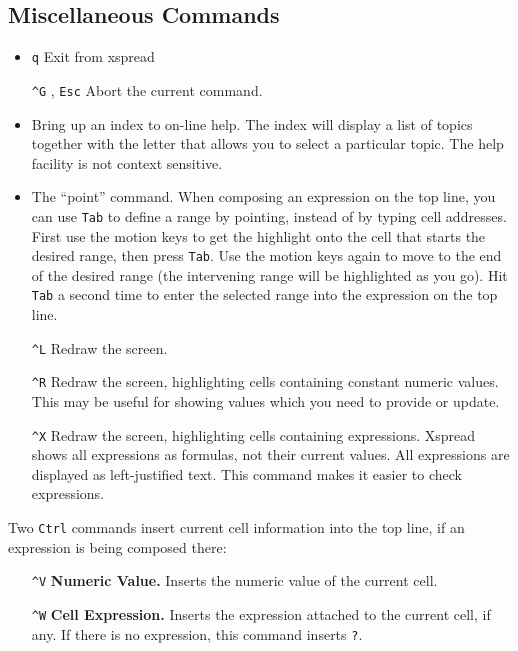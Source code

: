 \documentclass[titlepage]{article}
\newcommand{\titem}[1]{\item[{\tt #1}]}
\newcommand{\ctrl}[1]{\texttt{\^{}#1}}
\begin{document}
\subsection{Miscellaneous Commands}

\begin{itemize}
\titem{Q} \texttt{q} Exit from \textsf{xspread}

\item[\ctrl{G}], \texttt{Esc} Abort the current command.
  
\titem{?} Bring up an index to on-line help.  The index will display
  a list of topics together with the letter that allows you to select
  a particular topic.  The help facility is not context sensitive.
  
  \titem{Tab} The ``point'' command.  When composing an expression on
  the top line, you can use \texttt{Tab} to define a range by
  pointing, instead of by typing cell addresses.  First use the motion
  keys to get the highlight onto the cell that starts the desired
  range, then press \texttt{Tab}.  Use the motion keys again to move
  to the end of the desired range (the intervening range will be
  highlighted as you go).  Hit \texttt{Tab} a second time to enter the
  selected range into the expression on the top line.

  \item[\ctrl{L}] Redraw the screen.
    
  \item[\ctrl{R}] Redraw the screen, highlighting cells containing
    constant numeric values.  This may be useful for showing values
    which you need to provide or update.
    
  \item[\ctrl{X}] Redraw the screen, highlighting cells containing
    expressions.  \textsf{Xspread} shows all expressions as formulas,
    not their current values.  All expressions are displayed as
    left-justified text.  This command makes it easier to check
    expressions.

\end{itemize}

Two \texttt{Ctrl} commands insert current cell information into the
top line, if an expression is being composed there:
 
\begin{itemize}
  \item[\ctrl{V}] {\bf Numeric Value.} Inserts the numeric value of the
  current cell.
  
  \item[\ctrl{W}] {\bf Cell Expression.} Inserts the expression
  attached to the current cell, if any.  If there is no expression,
  this command inserts \texttt{?}.
\end{itemize}
\end{document}
